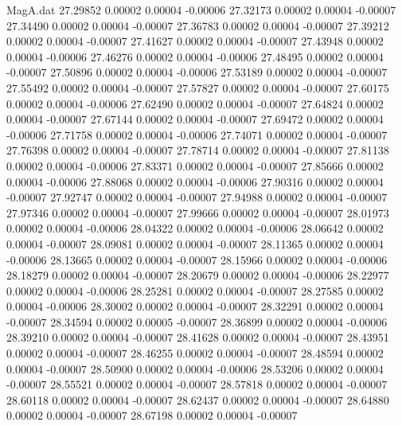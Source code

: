 \begin{filecontents}{MagA.dat}
  27.29852    0.00002    0.00004   -0.00006
  27.32173    0.00002    0.00004   -0.00007
  27.34490    0.00002    0.00004   -0.00007
  27.36783    0.00002    0.00004   -0.00007
  27.39212    0.00002    0.00004   -0.00007
  27.41627    0.00002    0.00004   -0.00007
  27.43948    0.00002    0.00004   -0.00006
  27.46276    0.00002    0.00004   -0.00006
  27.48495    0.00002    0.00004   -0.00007
  27.50896    0.00002    0.00004   -0.00006
  27.53189    0.00002    0.00004   -0.00007
  27.55492    0.00002    0.00004   -0.00007
  27.57827    0.00002    0.00004   -0.00007
  27.60175    0.00002    0.00004   -0.00006
  27.62490    0.00002    0.00004   -0.00007
  27.64824    0.00002    0.00004   -0.00007
  27.67144    0.00002    0.00004   -0.00007
  27.69472    0.00002    0.00004   -0.00006
  27.71758    0.00002    0.00004   -0.00006
  27.74071    0.00002    0.00004   -0.00007
  27.76398    0.00002    0.00004   -0.00007
  27.78714    0.00002    0.00004   -0.00007
  27.81138    0.00002    0.00004   -0.00006
  27.83371    0.00002    0.00004   -0.00007
  27.85666    0.00002    0.00004   -0.00006
  27.88068    0.00002    0.00004   -0.00006
  27.90316    0.00002    0.00004   -0.00007
  27.92747    0.00002    0.00004   -0.00007
  27.94988    0.00002    0.00004   -0.00007
  27.97346    0.00002    0.00004   -0.00007
  27.99666    0.00002    0.00004   -0.00007
  28.01973    0.00002    0.00004   -0.00006
  28.04322    0.00002    0.00004   -0.00006
  28.06642    0.00002    0.00004   -0.00007
  28.09081    0.00002    0.00004   -0.00007
  28.11365    0.00002    0.00004   -0.00006
  28.13665    0.00002    0.00004   -0.00007
  28.15966    0.00002    0.00004   -0.00006
  28.18279    0.00002    0.00004   -0.00007
  28.20679    0.00002    0.00004   -0.00006
  28.22977    0.00002    0.00004   -0.00006
  28.25281    0.00002    0.00004   -0.00007
  28.27585    0.00002    0.00004   -0.00006
  28.30002    0.00002    0.00004   -0.00007
  28.32291    0.00002    0.00004   -0.00007
  28.34594    0.00002    0.00005   -0.00007
  28.36899    0.00002    0.00004   -0.00006
  28.39210    0.00002    0.00004   -0.00007
  28.41628    0.00002    0.00004   -0.00007
  28.43951    0.00002    0.00004   -0.00007
  28.46255    0.00002    0.00004   -0.00007
  28.48594    0.00002    0.00004   -0.00007
  28.50900    0.00002    0.00004   -0.00006
  28.53206    0.00002    0.00004   -0.00007
  28.55521    0.00002    0.00004   -0.00007
  28.57818    0.00002    0.00004   -0.00007
  28.60118    0.00002    0.00004   -0.00007
  28.62437    0.00002    0.00004   -0.00007
  28.64880    0.00002    0.00004   -0.00007
  28.67198    0.00002    0.00004   -0.00007

\end{filecontents}
